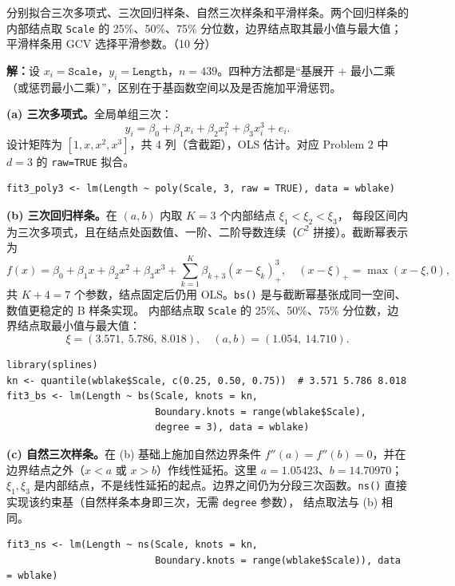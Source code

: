 \documentclass[12pt,a4paper]{article}
\begin{document}
分别拟合三次多项式、三次回归样条、自然三次样条和平滑样条。两个回归样条的内部结点取 \texttt{Scale} 的 25\%、50\%、75\% 分位数，边界结点取其最小值与最大值；平滑样条用 GCV 选择平滑参数。（10 分）

\begin{answerbox}
\textbf{解：}设 $x_i=\texttt{Scale}$，$y_i=\texttt{Length}$，$n=439$。四种方法都是``基展开 $+$ 最小二乘（或惩罚最小二乘）''，区别在于基函数空间以及是否施加平滑惩罚。

\textbf{(a) 三次多项式。}全局单组三次：
$$
y_i=\beta_0+\beta_1 x_i+\beta_2 x_i^2+\beta_3 x_i^3+e_i.
$$
设计矩阵为 $[1,x,x^2,x^3]$，共 4 列（含截距），OLS 估计。对应 Problem 2 中 $d=3$ 的 \texttt{raw=TRUE} 拟合。
\begin{lstlisting}[style=rcode]
fit3_poly3 <- lm(Length ~ poly(Scale, 3, raw = TRUE), data = wblake)
\end{lstlisting}

\textbf{(b) 三次回归样条。}在 $(a,b)$ 内取 $K=3$ 个内部结点 $\xi_1<\xi_2<\xi_3$，
每段区间内为三次多项式，且在结点处函数值、一阶、二阶导数连续（$C^2$ 拼接）。截断幂表示为
$$
f(x)=\beta_0+\beta_1 x+\beta_2 x^2+\beta_3 x^3
+\sum_{k=1}^{K}\beta_{k+3}(x-\xi_k)_+^3,\quad
(x-\xi)_+=\max(x-\xi,0),
$$
共 $K+4=7$ 个参数，结点固定后仍用 OLS。\texttt{bs()} 是与截断幂基张成同一空间、数值更稳定的 B 样条实现。
内部结点取 \texttt{Scale} 的 25\%、50\%、75\% 分位数，边界结点取最小值与最大值：
$$
\xi=(3.571,\ 5.786,\ 8.018),\quad (a,b)=(1.054,\ 14.710).
$$
\begin{lstlisting}[style=rcode]
library(splines)
kn <- quantile(wblake$Scale, c(0.25, 0.50, 0.75))  # 3.571 5.786 8.018
fit3_bs <- lm(Length ~ bs(Scale, knots = kn,
                          Boundary.knots = range(wblake$Scale),
                          degree = 3), data = wblake)
\end{lstlisting}

\textbf{(c) 自然三次样条。}在 (b) 基础上施加自然边界条件 $f''(a)=f''(b)=0$，并在边界结点之外（$x<a$ 或 $x>b$）作线性延拓。这里 $a=1.05423$、$b=14.70970$；$\xi_1,\xi_3$ 是内部结点，不是线性延拓的起点。边界之间仍为分段三次函数。\texttt{ns()} 直接实现该约束基（自然样条本身即三次，无需 \texttt{degree} 参数），
结点取法与 (b) 相同。
\begin{lstlisting}[style=rcode]
fit3_ns <- lm(Length ~ ns(Scale, knots = kn,
                          Boundary.knots = range(wblake$Scale)), data = wblake)
\end{lstlisting}


\end{answerbox}
\end{document}

